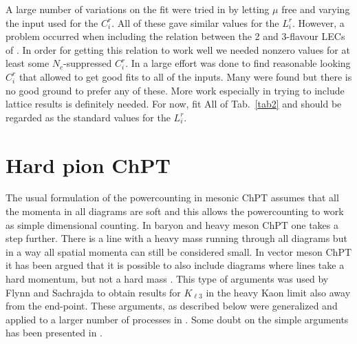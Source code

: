\documentclass[cits,hyper]{PoS}
\begin{document}
A large number of variations on the fit were tried in \cite{newfit} by letting
$\mu$ free and varying the input used for the $C_i^r$. All of these gave
similar values for the $L_i^r$. However, a problem occurred when including
the relation between the 2 and 3-flavour LECs of \cite{GHIS}. In order for
getting this relation to work well we needed nonzero values for at least some
$N_c$-suppressed $C_i^r$. In \cite{newfit} a large effort was done to find
reasonable looking $C_i^r$ that allowed to get good fits to all of the inputs.
Many were found but there is no good ground to prefer any of these.
More work especially in trying to include lattice results is definitely needed.
For now, fit All of Tab.~\ref{tab2} and \cite{newfit} should be regarded
as the standard values for the $L_i^r$.

\section{Hard pion ChPT}

The usual formulation of the powercounting in mesonic ChPT \cite{Weinberg0}
assumes that all the momenta in all diagrams are soft and this allows the
powercounting to work as simple dimensional counting. In baryon and heavy
meson ChPT one takes a step further. There is a line with a heavy mass
running through all diagrams but in a way all spatial momenta can still be
considered small. In vector meson ChPT it has been argued that it is possible
to also include diagrams where lines take a hard momentum, but not a hard mass
\cite{HP0}. This type of arguments was used by Flynn and Sachrajda \cite{HP1}
to obtain results for $K_{\ell3}$ in the heavy Kaon limit also away from the
end-point. These arguments, as described below were generalized and applied
to a larger number of processes in \cite{HP2,HP3,HP4,HP5}. Some doubt on
the simple arguments has been presented in \cite{Procura,HP6}.
\end{document}
